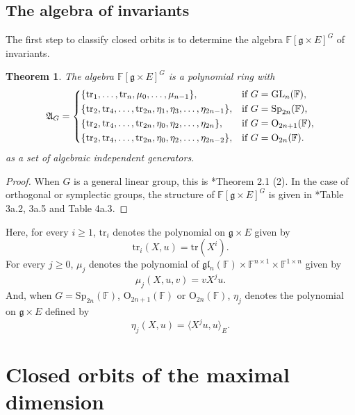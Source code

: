 \documentclass[12pt]{amsart}
\newtheorem{theorem}[lm]{Theorem}
\theoremstyle{definition}
\theoremstyle{remark}\newtheorem{rmk}[lm]{Remark}
\newcommand{\RO}{{\mathrm {O}}}
\newcommand{\GL}{{\mathrm{GL}}}
\newcommand{\Sp}{{\mathrm{Sp}}}
\newcommand{\tr}{{\mathrm{tr}}}
\newcommand{\g}{\mathfrak g}
\newcommand{\gl}{\mathfrak g \mathfrak l}
\newcommand{\C}{\mathbb{F}}
\begin{document}
	\subsection{The algebra of invariants}
    
	The first step to classify closed orbits is to determine the algebra $\C[\g\times E]^{G}$ of invariants. 

    \begin{theorem}
		\label{thm:structure}
		The algebra $\C[\g\times E]^{G}$ is a polynomial ring with   \begin{equation*}
        \mathfrak A_G=\begin{cases*}
        \{\tr_1,\dots,\tr_n,\mu_0,\dots,\mu_{n-1}\},&if $G=\GL_{n}(\C)$,\\
            \{\tr_2,\tr_4,\dots,\tr_{2n},\eta_1,\eta_3,\dots,\eta_{2n-1}\},&if $G=\Sp_{2n}(\C)$,\\
            \{\tr_2,\tr_4,\dots,\tr_{2n},\eta_0,\eta_2,\dots,\eta_{2n}\},&if $G=\RO_{2n+1}(\C)$,\\
            \{\tr_2,\tr_4,\dots,\tr_{2n},\eta_0,\eta_2,\dots,\eta_{2n-2}\},&if $G=\RO_{2n}(\C)$.
        \end{cases*}
    \end{equation*} as a set of algebraic independent generators.
	\end{theorem}
	\begin{proof}
		When $G$ is a general linear group, this is \cite{NO}*{Theorem 2.1 (2)}. In the case of orthogonal or symplectic groups, the structure of $\C[\g\times E]^G$ is given in \cite{Sch}*{Table 3a.2, 3a.5 and Table 4a.3}.
	\end{proof}
Here, for every $i\ge 1$, 	$\tr_i$ denotes the polynomial on $\g\times E$ given by 
    \begin{equation*}
        \tr_i(X,u)=\tr(X^i).
    \end{equation*}
 For every $j\ge 0$, $\mu_j$ denotes the polynomial of $\gl_n(\C)\times \C^{n\times 1}\times \C^{1\times n}$ given by 
    \begin{equation*}
        \mu_j(X,u,v)=vX^ju.
    \end{equation*}
And, when $G=\Sp_{2n}(\C)$, $\RO_{2n+1}(\C)$ or $\RO_{2n}(\C)$, $\eta_j$ denotes the polynomial on $\g\times E$ defined by 
    \begin{equation*}
        \eta_j(X,u)=\langle X^ju,u\rangle_E.
    \end{equation*}
 
  
	\section{Closed orbits of the maximal dimension}
	
\end{document}
